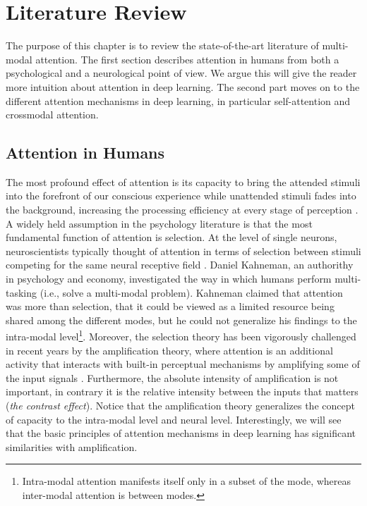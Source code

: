 \chapter{Literature Review}\label{chapter-literature-review} 

The purpose of this chapter is to review the state-of-the-art literature of multi-modal attention. The first section describes attention in humans from both a psychological and a neurological point of view. We argue this will give the reader more intuition about attention in deep learning. The second part moves on to the different attention mechanisms in deep learning, in particular self-attention and crossmodal attention. 


\section{Attention in Humans}
The most profound effect of attention is its capacity to bring the attended stimuli into the forefront of our conscious experience while unattended stimuli fades into the background, increasing the processing efficiency at every stage of perception \citep{watzl}. A widely held assumption in the psychology literature is that the most fundamental function of attention is selection. At the level of single neurons, neuroscientists typically thought of attention in terms of selection between stimuli competing for the same neural receptive field \citep{neuro-level}. Daniel Kahneman, an authorithy in psychology and economy, investigated the way in which humans perform multi-tasking (i.e., solve a multi-modal problem). Kahneman claimed that attention was more than selection, that it could be viewed as a limited resource being shared among the different modes, but he could not generalize his findings to the intra-modal level\footnote{Intra-modal attention manifests itself only in a subset of the mode, whereas inter-modal attention is between modes.}. Moreover, the selection theory has been vigorously challenged in recent years by the amplification theory, where attention is an additional activity that interacts with built-in perceptual mechanisms by amplifying some of the input signals \citep{amplification}. Furthermore, the absolute intensity of amplification is not important, in contrary it is the relative intensity between the inputs that matters (\textit{the contrast effect}). Notice that the amplification theory generalizes the concept of capacity to the intra-modal level and neural level. Interestingly, we will see that the basic principles of attention mechanisms in deep learning has significant similarities with amplification.

